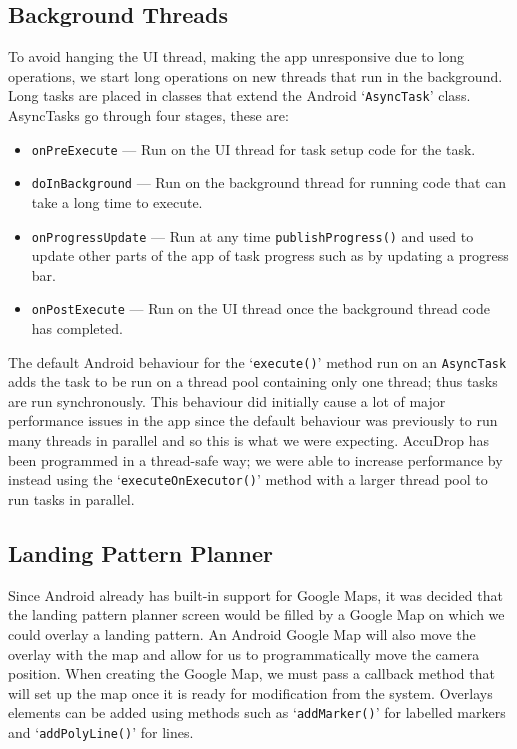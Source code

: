 \subsection{Background Threads}
To avoid hanging the UI thread, making the app unresponsive due to long operations, we start long operations on new threads that run in the background. Long tasks are placed in classes that extend the Android `\texttt{AsyncTask}' class. AsyncTasks go through four stages, these are:
\begin{itemize}
  \item \texttt{onPreExecute} --- Run on the UI thread for task setup code for the task.
  \item \texttt{doInBackground} --- Run on the background thread for running code that can take a long time to execute.
  \item \texttt{onProgressUpdate} --- Run at any time \texttt{publishProgress()} and used to update other parts of the app of task progress such as by updating a progress bar.
  \item \texttt{onPostExecute} --- Run on the UI thread once the background thread code has completed.
\end{itemize}

The default Android behaviour for the `\texttt{execute()}' method run on an \texttt{AsyncTask} adds the task to be run on a thread pool containing only one thread; thus tasks are run synchronously. This behaviour did initially cause a lot of major performance issues in the app since the default behaviour was previously to run many threads in parallel and so this is what we were expecting. AccuDrop has been programmed in a thread-safe way; we were able to increase performance by instead using the `\texttt{executeOnExecutor()}' method with a larger thread pool to run tasks in parallel.

\subsection{Landing Pattern Planner}
Since Android already has built-in support for Google Maps, it was decided that the landing pattern planner screen would be filled by a Google Map on which we could overlay a landing pattern. An Android Google Map will also move the overlay with the map and allow for us to programmatically move the camera position.
When creating the Google Map, we must pass a callback method that will set up the map once it is ready for modification from the system. Overlays elements can be added using methods such as `\texttt{addMarker()}' for labelled markers and `\texttt{addPolyLine()}' for lines.

